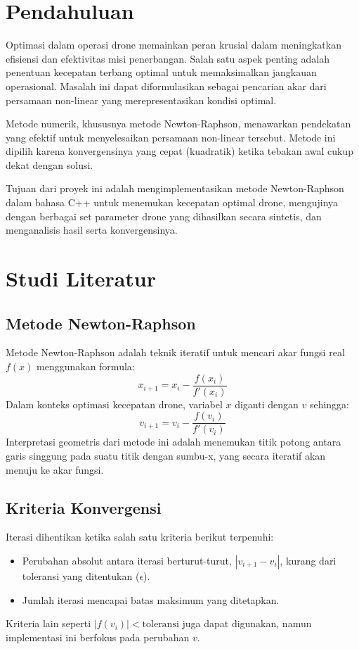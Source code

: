 \documentclass[conference]{IEEEtran}
\begin{document}
\section{Pendahuluan}
Optimasi dalam operasi drone memainkan peran krusial dalam meningkatkan efisiensi dan efektivitas misi penerbangan. Salah satu aspek penting adalah penentuan kecepatan terbang optimal untuk memaksimalkan jangkauan operasional. Masalah ini dapat diformulasikan sebagai pencarian akar dari persamaan non-linear yang merepresentasikan kondisi optimal.

Metode numerik, khususnya metode Newton-Raphson, menawarkan pendekatan yang efektif untuk menyelesaikan persamaan non-linear tersebut. Metode ini dipilih karena konvergensinya yang cepat (kuadratik) ketika tebakan awal cukup dekat dengan solusi.

Tujuan dari proyek ini adalah mengimplementasikan metode Newton-Raphson dalam bahasa C++ untuk menemukan kecepatan optimal drone, mengujinya dengan berbagai set parameter drone yang dihasilkan secara sintetis, dan menganalisis hasil serta konvergensinya.

\section{Studi Literatur}
\subsection{Metode Newton-Raphson}
Metode Newton-Raphson adalah teknik iteratif untuk mencari akar fungsi real $f(x)$ menggunakan formula:
\begin{equation}
x_{i+1} = x_i - \frac{f(x_i)}{f'(x_i)}
\end{equation}
Dalam konteks optimasi kecepatan drone, variabel $x$ diganti dengan $v$ sehingga:
\begin{equation}
v_{i+1} = v_i - \frac{f(v_i)}{f'(v_i)}
\end{equation}
Interpretasi geometris dari metode ini adalah menemukan titik potong antara garis singgung pada suatu titik dengan sumbu-x, yang secara iteratif akan menuju ke akar fungsi.

\subsection{Kriteria Konvergensi}
Iterasi dihentikan ketika salah satu kriteria berikut terpenuhi:
\begin{itemize}
\item Perubahan absolut antara iterasi berturut-turut, $|v_{i+1} - v_i|$, kurang dari toleransi yang ditentukan ($\epsilon$).
\item Jumlah iterasi mencapai batas maksimum yang ditetapkan.
\end{itemize}
Kriteria lain seperti $|f(v_i)| < \text{toleransi}$ juga dapat digunakan, namun implementasi ini berfokus pada perubahan $v$.
\end{document}
